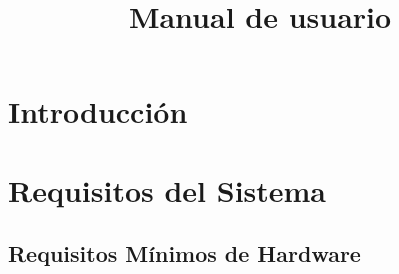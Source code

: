 \documentclass{Pretexto/bluereport}
\title{Manual de usuario}
\author{}
\date{}
\begin{document}



\tableofcontents
\pagebreak

\section{Introducción}


\section{Requisitos del Sistema}

\subsection{Requisitos Mínimos de Hardware}
\end{document}
